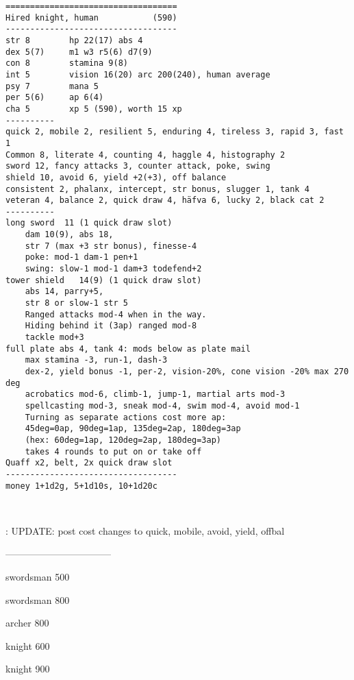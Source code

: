 \goodbreak \begin{samepage} \small \begin{verbatim}
===================================
Hired knight, human           (590)
-----------------------------------
str	8        hp 22(17) abs 4
dex	5(7)     m1 w3 r5(6) d7(9)
con	8        stamina 9(8)
int 5        vision 16(20) arc 200(240), human average
psy	7        mana 5
per	5(6)     ap 6(4)
cha	5        xp 5 (590), worth 15 xp
----------
quick 2, mobile 2, resilient 5, enduring 4, tireless 3, rapid 3, fast 1
Common 8, literate 4, counting 4, haggle 4, histography 2
sword 12, fancy attacks 3, counter attack, poke, swing
shield 10, avoid 6, yield +2(+3), off balance
consistent 2, phalanx, intercept, str bonus, slugger 1, tank 4
veteran 4, balance 2, quick draw 4, häfva 6, lucky 2, black cat 2
----------
long sword  11 (1 quick draw slot)
    dam 10(9), abs 18,
    str 7 (max +3 str bonus), finesse-4
    poke: mod-1 dam-1 pen+1
    swing: slow-1 mod-1 dam+3 todefend+2
tower shield   14(9) (1 quick draw slot)
    abs 14, parry+5,
    str 8 or slow-1 str 5
    Ranged attacks mod-4 when in the way.
    Hiding behind it (3ap) ranged mod-8
    tackle mod+3
full plate abs 4, tank 4: mods below as plate mail
    max stamina -3, run-1, dash-3
    dex-2, yield bonus -1, per-2, vision-20%, cone vision -20% max 270 deg
    acrobatics mod-6, climb-1, jump-1, martial arts mod-3
    spellcasting mod-3, sneak mod-4, swim mod-4, avoid mod-1
    Turning as separate actions cost more ap:
    45deg=0ap, 90deg=1ap, 135deg=2ap, 180deg=3ap
    (hex: 60deg=1ap, 120deg=2ap, 180deg=3ap)
    takes 4 rounds to put on or take off
Quaff x2, belt, 2x quick draw slot
-----------------------------------
money 1+1d2g, 5+1d10s, 10+1d20c
\end{verbatim} \normalsize \end{samepage}

\

\vfill
\TODO: UPDATE: post cost changes to quick, mobile, avoid, yield, offbal









\clearpage
\TODO ---------------------------------

\todo swordsman 500

\todo swordsman 800

\todo archer 800

\todo knight 600

\todo knight 900








%
